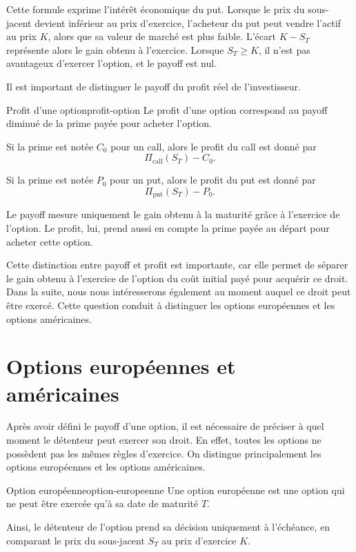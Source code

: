 \documentclass[11pt]{report}
\begin{document}
Cette formule exprime l'intérêt économique du put. Lorsque le prix du sous-jacent devient inférieur au prix d'exercice, l'acheteur du put peut vendre l'actif au prix $K$, alors que sa valeur de marché est plus faible. L'écart $K - S_T$ représente alors le gain obtenu à l'exercice. Lorsque $S_T \geq K$, il n'est pas avantageux d'exercer l'option, et le payoff est nul.

Il est important de distinguer le payoff du profit réel de l'investisseur.

\begin{definition}{Profit d'une option}{profit-option}
Le profit d'une option correspond au payoff diminué de la prime payée pour acheter l'option.

Si la prime est notée $C_0$ pour un call, alors le profit du call est donné par
\[
\Pi_{\text{call}}(S_T) - C_0.
\]

Si la prime est notée $P_0$ pour un put, alors le profit du put est donné par
\[
\Pi_{\text{put}}(S_T) - P_0.
\]
\end{definition}

Le payoff mesure uniquement le gain obtenu à la maturité grâce à l'exercice de l'option. Le profit, lui, prend aussi en compte la prime payée au départ pour acheter cette option.

Cette distinction entre payoff et profit est importante, car elle permet de séparer le gain obtenu à l'exercice de l'option du coût initial payé pour acquérir ce droit. Dans la suite, nous nous intéresserons également au moment auquel ce droit peut être exercé. Cette question conduit à distinguer les options européennes et les options américaines.

\section{Options européennes et américaines}

Après avoir défini le payoff d'une option, il est nécessaire de préciser à quel moment le détenteur peut exercer son droit. En effet, toutes les options ne possèdent pas les mêmes règles d'exercice. On distingue principalement les options européennes et les options américaines.

\begin{definition}{Option européenne}{option-europeenne}
Une option européenne est une option qui ne peut être exercée qu'à sa date de maturité $T$.

Ainsi, le détenteur de l'option prend sa décision uniquement à l'échéance, en comparant le prix du sous-jacent $S_T$ au prix d'exercice $K$.
\end{definition}
\end{document}
